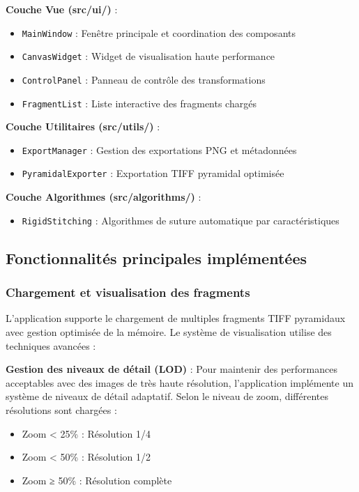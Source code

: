 \documentclass[12pt,a4paper]{report}
\begin{document}
\begin{}
\begin{}
\begin{}
\begin{}
\textbf{Couche Vue (src/ui/)} :
\begin{itemize}
\item \texttt{MainWindow} : Fenêtre principale et coordination des composants
\item \texttt{CanvasWidget} : Widget de visualisation haute performance
\item \texttt{ControlPanel} : Panneau de contrôle des transformations
\item \texttt{FragmentList} : Liste interactive des fragments chargés
\end{itemize}

\textbf{Couche Utilitaires (src/utils/)} :
\begin{itemize}
\item \texttt{ExportManager} : Gestion des exportations PNG et métadonnées
\item \texttt{PyramidalExporter} : Exportation TIFF pyramidal optimisée
\end{itemize}

\textbf{Couche Algorithmes (src/algorithms/)} :
\begin{itemize}
\item \texttt{RigidStitching} : Algorithmes de suture automatique par caractéristiques
\end{itemize}

\subsection{Fonctionnalités principales implémentées}

\subsubsection{Chargement et visualisation des fragments}

L'application supporte le chargement de multiples fragments TIFF pyramidaux avec gestion optimisée de la mémoire. Le système de visualisation utilise des techniques avancées :

\textbf{Gestion des niveaux de détail (LOD)} : Pour maintenir des performances acceptables avec des images de très haute résolution, l'application implémente un système de niveaux de détail adaptatif. Selon le niveau de zoom, différentes résolutions sont chargées :
\begin{itemize}
\item Zoom < 25\% : Résolution 1/4
\item Zoom < 50\% : Résolution 1/2  
\item Zoom ≥ 50\% : Résolution complète
\end{itemize}


\end{}
\end{}
\end{}
\end{}
\end{document}
